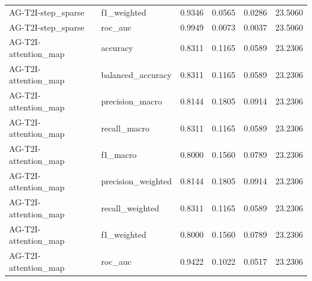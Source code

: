 \begin{tabular}{llrrrr}
AG-T2I-step_sparse & f1_weighted & 0.9346 & 0.0565 & 0.0286 & 23.5060 \\
AG-T2I-step_sparse & roc_auc & 0.9949 & 0.0073 & 0.0037 & 23.5060 \\
AG-T2I-attention_map & accuracy & 0.8311 & 0.1165 & 0.0589 & 23.2306 \\
AG-T2I-attention_map & balanced_accuracy & 0.8311 & 0.1165 & 0.0589 & 23.2306 \\
AG-T2I-attention_map & precision_macro & 0.8144 & 0.1805 & 0.0914 & 23.2306 \\
AG-T2I-attention_map & recall_macro & 0.8311 & 0.1165 & 0.0589 & 23.2306 \\
AG-T2I-attention_map & f1_macro & 0.8000 & 0.1560 & 0.0789 & 23.2306 \\
AG-T2I-attention_map & precision_weighted & 0.8144 & 0.1805 & 0.0914 & 23.2306 \\
AG-T2I-attention_map & recall_weighted & 0.8311 & 0.1165 & 0.0589 & 23.2306 \\
AG-T2I-attention_map & f1_weighted & 0.8000 & 0.1560 & 0.0789 & 23.2306 \\
AG-T2I-attention_map & roc_auc & 0.9422 & 0.1022 & 0.0517 & 23.2306 \\
\bottomrule
\end{tabular}
